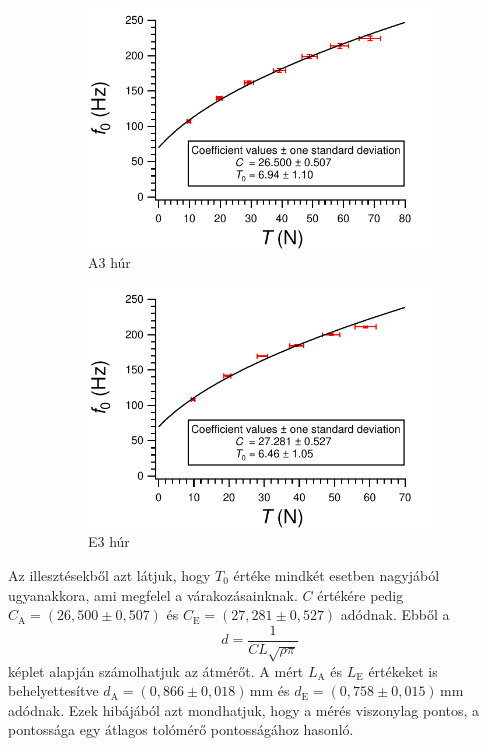 \documentclass[a4paper,12pt]{article}
\begin{document}
\begin{figure}[h!]
\centering
\begin{subfigure}[t]{0.5\linewidth}
\centering
\includegraphics[width = \linewidth]{f_vs_T_A.pdf}
\caption{A3 húr}
\end{subfigure}%
\begin{subfigure}[t]{0.5\linewidth}
\centering
\includegraphics[width = \linewidth]{f_vs_T_E.pdf}
\caption{E3 húr}
\end{subfigure}
\caption{}
\label{f_vs_T}
\end{figure}

Az illesztésekből azt látjuk, hogy $T_0$ értéke mindkét esetben nagyjából ugyanakkora, ami megfelel a várakozásainknak. $C$ értékére pedig $C_\text{A} = (26,500 \pm 0,507)$ és $C_\text{E} = (27,281 \pm 0,527)$ adódnak. Ebből a
$$ d = \frac{1}{C L \sqrt{\rho \pi}} $$
képlet alapján számolhatjuk az átmérőt. A mért $L_\text{A}$ és $L_\text{E}$ értékeket is behelyettesítve $d_\text{A} = (0,866 \pm 0,018)$\,mm és $d_\text{E} = (0,758 \pm 0,015)$\,mm adódnak. Ezek hibájából azt mondhatjuk, hogy a mérés viszonylag pontos, a pontossága egy átlagos tolómérő pontosságához hasonló.
\end{document}
